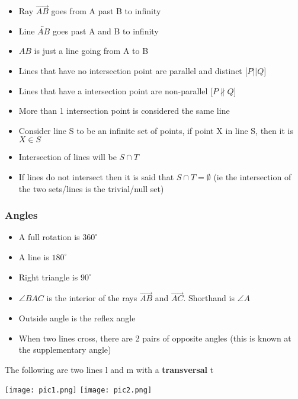 \documentclass[11pt]{article}
\begin{document}
\begin{itemize}
  \item Ray $\overrightarrow{AB}$ goes from A past B to infinity
  \item Line $\overleftrightarrow{AB}$ goes past A and B to infinity
  \item $AB$ is just a line going from A to B
  \item Lines that have no intersection point are parallel and distinct [$P|| Q$]
  \item Lines that have a intersection point are non-parallel [$P\nparallel Q$]
  \item More than 1 intersection point is considered the same line
  \item Consider line S to be an infinite set of points, if point X in line S, then it is $X\in S$
  \item Intersection of lines will be $S\cap T$ 
  \item If lines do not intersect then it is said that $S\cap T=\emptyset$ (ie the intersection of the two sets/lines is the trivial/null set)
\end{itemize}


\subsubsection{Angles}

\begin{itemize}
  \item A full rotation is $360^{\circ}$
  \item A line is $180^{\circ}$
  \item Right triangle is $90^{\circ}$
  \item $\angle BAC$ is the interior of the rays $\overrightarrow{AB}$ and $\overrightarrow{AC}$. Shorthand is $\angle A$
  \item Outside angle is the reflex angle
  \item When two lines cross, there are 2 pairs of opposite angles (this is known at the supplementary angle)
\end{itemize}

The following are two lines l and m with a \textbf{transversal} t

\noindent\texttt{[image: pic1.png]}
\noindent\texttt{[image: pic2.png]}
\end{document}
